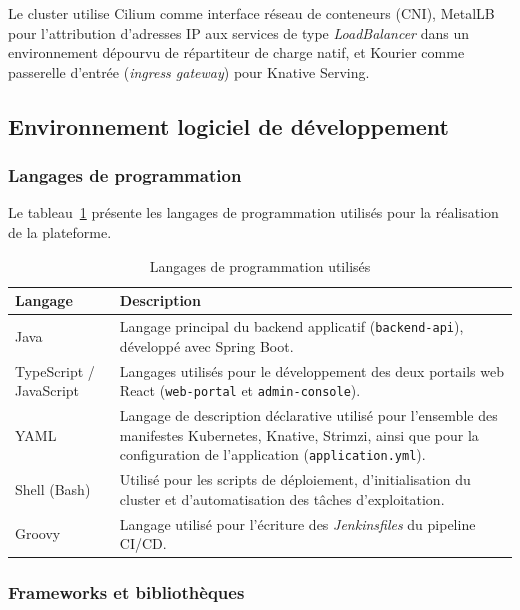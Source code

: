     Le cluster utilise Cilium comme interface réseau de conteneurs (CNI), MetalLB pour l'attribution d'adresses IP aux services de type \textit{LoadBalancer} dans un environnement dépourvu de répartiteur de charge natif, et Kourier comme passerelle d'entrée (\textit{ingress gateway}) pour Knative Serving.
    
    \subsection{Environnement logiciel de développement}
    
    \subsubsection{Langages de programmation}

    Le tableau~\ref{tab:langages} présente les langages de programmation utilisés pour la réalisation de la plateforme.

    \begin{table}[H]
    \begin{center}
    \begin{tabular}{|l{3.2cm}|p{10cm}|}
    \hline
    \textbf{Langage} & \textbf{Description} \\
    \hline
    Java & Langage principal du backend applicatif (\texttt{backend-api}), développé avec Spring Boot. \\
    \hline
    TypeScript / JavaScript & Langages utilisés pour le développement des deux portails web React (\texttt{web-portal} et \texttt{admin-console}). \\
    \hline
    YAML & Langage de description déclarative utilisé pour l'ensemble des manifestes Kubernetes, Knative, Strimzi, ainsi que pour la configuration de l'application (\texttt{application.yml}). \\
    \hline
    Shell (Bash) & Utilisé pour les scripts de déploiement, d'initialisation du cluster et d'automatisation des tâches d'exploitation. \\
    \hline
    Groovy & Langage utilisé pour l'écriture des \textit{Jenkinsfiles} du pipeline CI/CD. \\
    \hline
    \end{tabular}
    \caption{Langages de programmation utilisés}
    \label{tab:langages}
    \end{center}
    \end{table}
    
    \subsubsection{Frameworks et bibliothèques}

